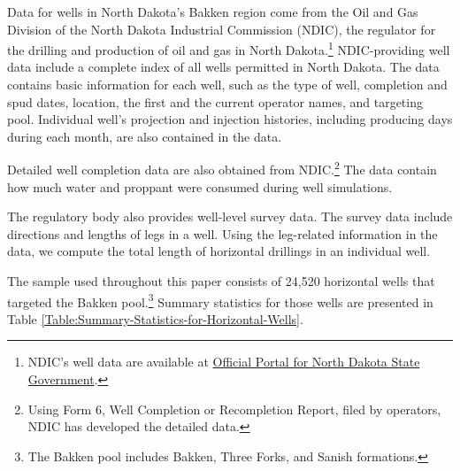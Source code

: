 Data for wells in North Dakota's Bakken region come from the Oil and Gas Division of the North Dakota Industrial Commission (NDIC), the regulator for the drilling and production of oil and gas in North Dakota.\footnote{NDIC's well data are available at \href{https://www.dmr.nd.gov/oilgas}{Official Portal for North Dakota State Government}.} NDIC-providing well data include a complete index of all wells permitted in North Dakota. The data contains basic information for each well, such as the type of well, completion and spud dates, location, the first and the current operator names, and targeting pool. Individual well's projection and injection histories, including producing days during each month, are also contained in the data. 

Detailed well completion data are also obtained from NDIC.\footnote{Using Form 6, Well Completion or Recompletion Report, filed by operators, NDIC has developed the detailed data.} The data contain how much water and proppant were consumed during well simulations.

The regulatory body also provides well-level survey data. The survey data include directions and lengths of legs in a well. Using the leg-related information in the data, we compute the total length of horizontal drillings in an individual well. 

The sample used throughout this paper consists of 24,520 horizontal wells that targeted the Bakken pool.\footnote{The Bakken pool includes Bakken, Three Forks, and Sanish formations.} Summary statistics for those wells are presented in Table \ref{Table:Summary-Statistics-for-Horizontal-Wells}.
